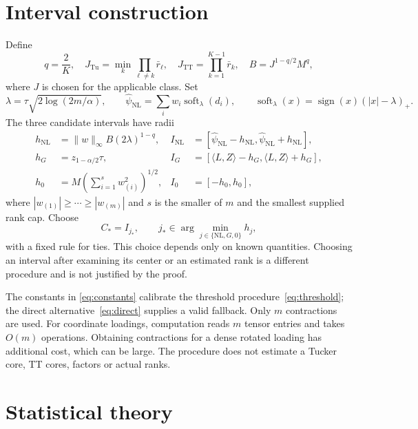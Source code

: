 \documentclass[11pt]{article}
\theoremstyle{remark}
\newcommand{\ip}[2]{\langle #1,#2\rangle}
\newcommand{\norm}[1]{\lVert #1\rVert}
\newcommand{\soft}{\operatorname{soft}}
\newcommand{\Tu}{\mathrm{Tu}}
\newcommand{\TT}{\mathrm{TT}}
\newcommand{\NL}{\mathrm{NL}}
\begin{document}
\section{Interval construction}\label{sec:method}

Define
\begin{equation}\label{eq:constants}
 q=\frac2K,\quad
 J_{\Tu}=\min_k\prod_{\ell\ne k}\bar r_\ell,\quad
 J_{\TT}=\prod_{k=1}^{K-1}\bar r_k,\quad B=J^{1-q/2}M^q,
\end{equation}
where $J$ is chosen for the applicable class. Set
\begin{equation}\label{eq:threshold}
 \lambda=\tau\sqrt{2\log(2m/\alpha)},\qquad
 \widehat\psi_{\NL}=\sum_iw_i\soft_\lambda(d_i),\qquad
 \soft_\lambda(x)=\operatorname{sign}(x)(|x|-\lambda)_+.
\end{equation}
The three candidate intervals have radii
\begin{align}
 h_{\NL}&=\norm w_\infty B(2\lambda)^{1-q},&
 I_{\NL}&=[\widehat\psi_{\NL}-h_{\NL},\widehat\psi_{\NL}+h_{\NL}],\label{eq:nl}\\
 h_G&=z_{1-\alpha/2}\tau,&
 I_G&=[\ip LZ-h_G,\ip LZ+h_G],\label{eq:direct}\\
 h_0&=M\left(\sum_{i=1}^s w_{(i)}^2\right)^{1/2},&
 I_0&=[-h_0,h_0],\label{eq:zero}
\end{align}
where $|w_{(1)}|\ge\cdots\ge|w_{(m)}|$ and $s$ is the smaller of $m$ and the smallest supplied rank cap. Choose
\begin{equation}\label{eq:select}
 C_*=I_{j_*},\qquad j_*\in\arg\min_{j\in\{\NL,G,0\}}h_j,
\end{equation}
with a fixed rule for ties. This choice depends only on known quantities. Choosing an interval after examining its center or an estimated rank is a different procedure and is not justified by the proof.

The constants in \eqref{eq:constants} calibrate the threshold procedure~\eqref{eq:threshold}; the direct alternative~\eqref{eq:direct} supplies a valid fallback. Only $m$ contractions are used. For coordinate loadings, computation reads $m$ tensor entries and takes $O(m)$ operations. Obtaining contractions for a dense rotated loading has additional cost, which can be large. The procedure does not estimate a Tucker core, TT cores, factors or actual ranks.

\section{Statistical theory}\label{sec:theory}
\end{document}
